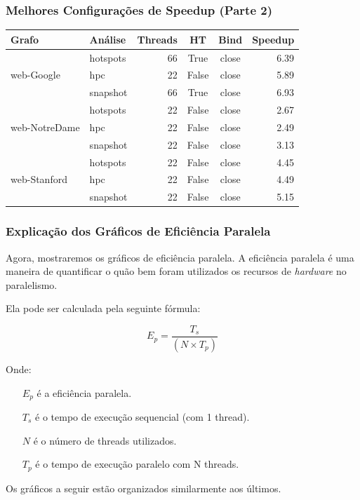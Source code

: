 \documentclass{beamer}
\begin{document}
\begin{frame}[fragile]
    \frametitle{Melhores Configurações de Speedup (Parte 2)}
    
    \begin{center}
    \scriptsize 
    \setlength{\tabcolsep}{4pt} 
    
    \begin{tabular}{@{}llrccr@{}}
        \toprule
        \textbf{Grafo} & \textbf{Análise} & \textbf{Threads} & \textbf{HT} & \textbf{Bind} & \textbf{Speedup} \\
        \midrule
        \multirow{3}{*}{web-Google} & hotspots & 66 & True & close & 6.39 \\
         & hpc & 22 & False & close & 5.89 \\
         & snapshot & 66 & True & close & 6.93 \\
        \midrule
        \multirow{3}{*}{web-NotreDame} & hotspots & 22 & False & close & 2.67 \\
         & hpc & 22 & False & close & 2.49 \\
         & snapshot & 22 & False & close & 3.13 \\
        \midrule
        \multirow{3}{*}{web-Stanford} & hotspots & 22 & False & close & 4.45 \\
         & hpc & 22 & False & close & 4.49 \\
         & snapshot & 22 & False & close & 5.15 \\
        \bottomrule
    \end{tabular}
    \end{center} 
\end{frame}

\begin{frame}
    \frametitle{Explicação dos Gráficos de Eficiência Paralela}
        Agora, mostraremos os gráficos de eficiência paralela.
        A eficiência paralela é uma maneira de quantificar o quão bem foram utilizados os recursos de \textit{hardware} no paralelismo.

        Ela pode ser calculada pela seguinte fórmula:
        
        $$ E_p = \frac{T_s}{(N \times T_p)} $$
    
        Onde:
        \begin{itemize}
            \item[$E_p$] é a eficiência paralela.
            \item[$T_s$] é o tempo de execução sequencial (com 1 thread).
            \item[$N$] é o número de threads utilizados.
            \item[$T_p$] é o tempo de execução paralelo com N threads.
        \end{itemize}
        
        \vspace{\fill} %
        
        Os gráficos a seguir estão organizados similarmente aos últimos.
\end{frame}
\end{document}
